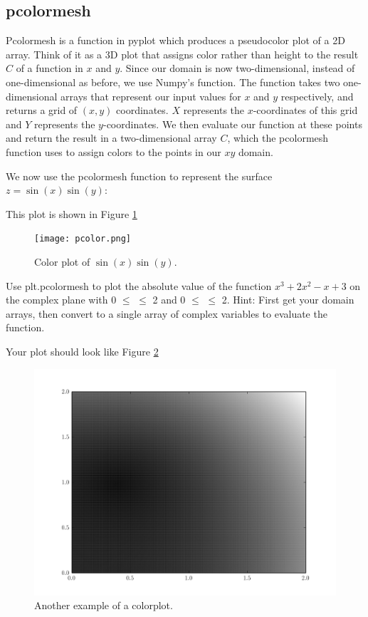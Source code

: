 \subsection*{pcolormesh}
Pcolormesh is a function in pyplot which produces a pseudocolor plot of a 2D array. Think of it as a 3D plot that assigns color rather than height to the result $C$ of a function in $x$ and $y$. Since our domain is now two-dimensional, instead of one-dimensional as before, we use Numpy's  function. The  function takes two one-dimensional arrays that represent our input values for $x$ and $y$ respectively, and returns a grid of $(x, y)$ coordinates. $X$ represents the $x$-coordinates of this grid and $Y$ represents the $y$-coordinates. We then evaluate our function at these points and return the result in a two-dimensional array $C$, which the pcolormesh function uses to assign colors to the points in our $xy$ domain.

We now use the pcolormesh function to represent 
the surface $z=\sin(x)\sin(y)$:


 
This plot is shown in Figure \ref{mpl:pcmexample}

\begin{figure} 
\texttt{[image: pcolor.png]}
\caption{Color plot of $\sin\left(x\right)\sin\left(y\right)$.}
\label{mpl:pcmexample} 
\end{figure}

\begin{problem} Use plt.pcolormesh to plot the absolute value of the function $x^3 +2x^2 -x +3$ on the complex plane with 0 $\leq$  $\leq$ 2 and 0 $\leq$  $\leq$ 2. Hint: First get your domain arrays, then convert to a single array of complex variables to evaluate the function.

Your plot should look like Figure \ref{mpl:pcolormesh} 
\end{problem}


\begin{figure} 
\includegraphics[width=\textwidth]{pcolor2.png}
\caption{Another example of a colorplot.} 
\label{mpl:pcolormesh}
\end{figure}


